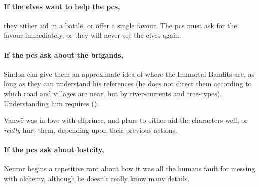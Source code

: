 \paragraph{If the elves want to help the \glspl{pc},}
they either aid in a battle, or offer a single favour.
The \glspl{pc} must ask for the favour immediately, or they will never see the elves again.


\paragraph{If the \glspl{pc} ask about the brigands,}
Sindon can give them an approximate idea of where the Immortal Bandits are, as long as they can understand his references (he does not direct them according to which road and \glspl{village} are near, but by river-currents and tree-types).
Understanding him requires  (\tn[10]).


Vanw\"e was in love with \gls{elfprince}, and plans to either aid the characters well, or \emph{really} hurt them, depending upon their previous actions.

\label{neuror}

\paragraph{If the \glspl{pc} ask about \gls{lostcity},}
Neuror begins a repetitive rant about how it was all the humans fault for messing with alchemy, although he doesn't really know many details.

